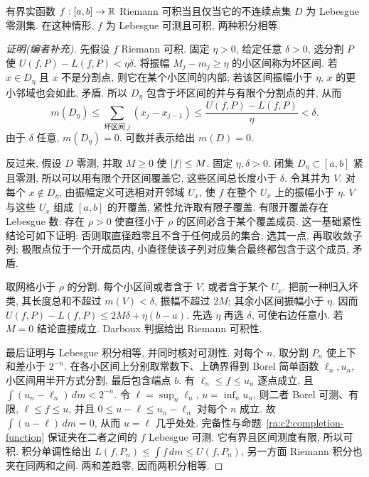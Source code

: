 \begin{theorem}\label{ra:c2:riemann-criterion}
有界实函数 $f:[a,b]\to\mathbb R$ Riemann 可积当且仅当它的不连续点集 $D$ 为 Lebesgue 零测集. 在这种情形, $f$ 为 Lebesgue 可测且可积, 两种积分相等.
\end{theorem}
\begin{proof}[证明(编者补充)]
先假设 $f$ Riemann 可积. 固定 $\eta>0$, 给定任意 $\delta>0$, 选分割 $P$ 使 $U(f,P)-L(f,P)<\eta\delta$. 将振幅 $M_j-m_j\ge\eta$ 的小区间称为坏区间. 若 $x\in D_\eta$ 且 $x$ 不是分割点, 则它在某个小区间的内部; 若该区间振幅小于 $\eta$, $x$ 的更小邻域也会如此, 矛盾. 所以 $D_\eta$ 包含于坏区间的并与有限个分割点的并, 从而
\[
 m(D_\eta)\le\sum_{\text{坏区间 }j}(x_j-x_{j-1})
 \le\frac{U(f,P)-L(f,P)}{\eta}<\delta.
\]
由于 $\delta$ 任意, $m(D_\eta)=0$. 可数并表示给出 $m(D)=0$.

反过来, 假设 $D$ 零测, 并取 $M\ge0$ 使 $\lvert f\rvert\le M$. 固定 $\eta,\delta>0$. 闭集 $D_\eta\subset[a,b]$ 紧且零测, 所以可以用有限个开区间覆盖它, 这些区间总长度小于 $\delta$. 令其并为 $V$. 对每个 $x\notin D_\eta$, 由振幅定义可选相对开邻域 $U_x$, 使 $f$ 在整个 $U_x$ 上的振幅小于 $\eta$. $V$ 与这些 $U_x$ 组成 $[a,b]$ 的开覆盖, 紧性允许取有限子覆盖. 有限开覆盖存在 Lebesgue 数: 存在 $\rho>0$ 使直径小于 $\rho$ 的区间必含于某个覆盖成员. 这一基础紧性结论可如下证明: 否则取直径趋零且不含于任何成员的集合, 选其一点, 再取收敛子列; 极限点位于一个开成员内, 小直径使该子列对应集合最终都包含于这个成员, 矛盾.

取网格小于 $\rho$ 的分割. 每个小区间或者含于 $V$, 或者含于某个 $U_x$. 把前一种归入坏类, 其长度总和不超过 $m(V)<\delta$, 振幅不超过 $2M$; 其余小区间振幅小于 $\eta$. 因而 $U(f,P)-L(f,P)\le2M\delta+\eta(b-a)$. 先选 $\eta$ 再选 $\delta$, 可使右边任意小. 若 $M=0$ 结论直接成立. Darboux 判据给出 Riemann 可积性.

最后证明与 Lebesgue 积分相等, 并同时核对可测性. 对每个 $n$, 取分割 $P_n$ 使上下和差小于 $2^{-n}$. 在各小区间上分别取常数下、上确界得到 Borel 简单函数 $\ell_n,u_n$, 小区间用半开方式分割, 最后包含端点 $b$. 有 $\ell_n\le f\le u_n$ 逐点成立, 且 $\int(u_n-\ell_n)\,dm<2^{-n}$. 令 $\ell=\sup_n\ell_n$, $u=\inf_nu_n$, 则二者 Borel 可测、有限, $\ell\le f\le u$, 并且 $0\le u-\ell\le u_n-\ell_n$ 对每个 $n$ 成立. 故 $\int(u-\ell)\,dm=0$, 从而 $u=\ell$ 几乎处处. 完备性与命题~\ref{ra:c2:completion-function} 保证夹在二者之间的 $f$ Lebesgue 可测. 它有界且区间测度有限, 所以可积. 积分单调性给出 $L(f,P_n)\le\int f\,dm\le U(f,P_n)$, 另一方面 Riemann 积分也夹在同两和之间. 两和差趋零, 因而两积分相等.
\end{proof}

